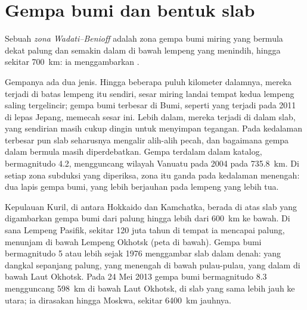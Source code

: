 \section{Gempa bumi dan bentuk slab}\label{sec:b1:active-margins:seismicity}

\begin{definition}\label{def:b1:active-margins:wadati-benioff}
Sebuah \emph{zona Wadati--Benioff} adalah zona gempa bumi miring yang bermula dekat palung dan semakin dalam di bawah lempeng yang menindih, hingga sekitar \qty{700}{km}: ia menggambarkan .
\end{definition}

Gempanya ada dua jenis. Hingga beberapa puluh kilometer dalamnya, mereka terjadi di batas lempeng itu sendiri, sesar miring landai tempat kedua lempeng saling tergelincir; gempa bumi terbesar di Bumi, seperti yang terjadi pada 2011 di lepas Jepang, memecah sesar ini. Lebih dalam, mereka terjadi di dalam slab, yang sendirian masih cukup dingin untuk menyimpan tegangan. Pada kedalaman terbesar pun slab seharusnya mengalir alih-alih pecah, dan bagaimana gempa dalam bermula masih diperdebatkan. Gempa terdalam dalam katalog, bermagnitudo 4.2, mengguncang wilayah Vanuatu pada 2004 pada \qty{735.8}{km}. Di setiap zona subduksi yang diperiksa, zona itu ganda pada kedalaman menengah: dua lapis gempa bumi, yang lebih berjauhan pada lempeng yang lebih tua.

Kepulauan Kuril, di antara Hokkaido dan Kamchatka, berada di atas slab yang digambarkan gempa bumi dari palung hingga lebih dari \qty{600}{km} ke bawah. Di sana Lempeng Pasifik, sekitar 120 juta tahun di tempat ia mencapai palung, menunjam di bawah Lempeng Okhotsk (peta di bawah). Gempa bumi bermagnitudo 5 atau lebih sejak 1976 menggambar slab dalam denah: yang dangkal sepanjang palung, yang menengah di bawah pulau-pulau, yang dalam di bawah Laut Okhotsk. Pada 24 Mei 2013 gempa bumi bermagnitudo 8.3 mengguncang \qty{598}{km} di bawah Laut Okhotsk, di slab yang sama lebih jauh ke utara; ia dirasakan hingga Moskwa, sekitar \qty{6400}{km} jauhnya.

